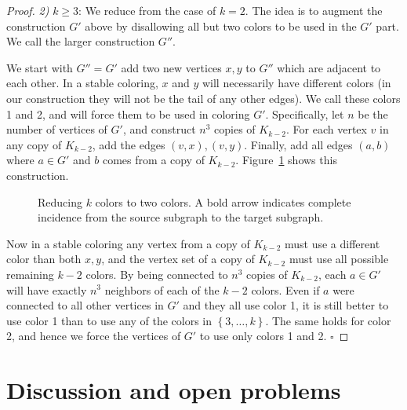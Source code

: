 \documentclass{llncs}
\begin{document}
\begin{proof}
\noindent \emph{2)} $k\ge3$:
We reduce from the case of $k=2$. The idea is to augment the
construction $G'$ above by disallowing all but two colors to be used in the
$G'$ part. We call the larger construction $G''$. 

We start with $G'' = G'$ add two new vertices $x,y$ to $G''$ which are
adjacent to each other. In a stable coloring, $x$ and $y$ will necessarily have
different colors (in our construction they will not be the tail of any other
edges). We call these colors 1 and 2, and will force them to be used in coloring $G'$.
Specifically, let $n$ be the number of vertices of $G'$, and construct
$n^3$ copies of $K_{k-2}$. For each vertex $v$ in any copy of $K_{k-2}$, add
the edges $(v,x), (v,y)$. Finally, add all edges $(a,b)$ where $a \in G'$ and
$b$ comes from a copy of $K_{k-2}$. Figure~\ref{weakkcolornphard} shows this
construction. 

\begin{figure}[htb]
\centering
{}
\caption{Reducing $k$ colors to two colors. A bold arrow indicates complete
incidence from the source subgraph to the target subgraph.}
\label{weakkcolornphard}
\end{figure}

Now in a stable coloring any vertex from a copy of $K_{k-2}$ must use a
different color than both $x,y$, and the vertex set of a copy of $K_{k-2}$ must
use all possible remaining $k-2$ colors. By being connected to $n^3$ copies of
$K_{k-2}$, each $a \in G'$ will have exactly $n^3$ neighbors of each of the
$k-2$ colors. Even if $a$ were connected to all other vertices in $G'$ and they
all use color 1, it is still better to use color 1 than to use any of the
colors in $\left \{ 3, \dots, k \right \}$. The same holds for color 2, and
hence we force the vertices of $G'$ to use only colors 1 and 2.  
\hfill $\square$
\end{proof}

\section{Discussion and open problems}
\end{document}

